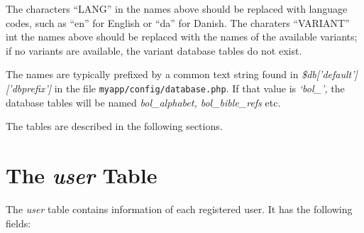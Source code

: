 \documentclass[11pt,oneside,a4paper]{memoir}
\newcommand{\q}{{\mainnolig '}}
\begin{document}
The characters ``LANG'' in the names above should be replaced with language codes, such as ``en''
for English or ``da'' for Danish. The charaters ``VARIANT'' int the names above should be replaced
with the names of the available variants; if no variants are available, the variant database tables
do not exist.

The names are typically prefixed by a common text string found in
\emph{\$db[\q default\q][\q dbprefix\q]} in the file \texttt{myapp/config/database.php}. If that
value is \emph{`bol\_',} the database tables will be named \emph{bol\_alphabet,
  bol\_bible\_refs} etc.

The tables are described in the following sections.

\section{The \emph{user} Table}\label{sec-user-table}

The \emph{user} table contains information of each registered user. It has the following fields:
\end{document}
